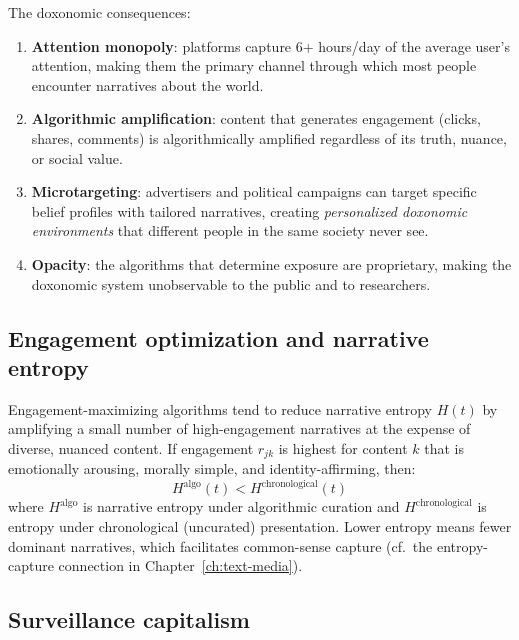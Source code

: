 The doxonomic consequences:
\begin{enumerate}[nosep]
  \item \textbf{Attention monopoly}: platforms capture 6+ hours/day of the average user's attention, making them the primary channel through which most people encounter narratives about the world.
  \item \textbf{Algorithmic amplification}: content that generates engagement (clicks, shares, comments) is algorithmically amplified regardless of its truth, nuance, or social value.
  \item \textbf{Microtargeting}: advertisers and political campaigns can target specific belief profiles with tailored narratives, creating \emph{personalized doxonomic environments} that different people in the same society never see.
  \item \textbf{Opacity}: the algorithms that determine exposure are proprietary, making the doxonomic system unobservable to the public and to researchers.
\end{enumerate}

\subsection{Engagement optimization and narrative entropy}

\begin{proposition}
\label{prop:algo-entropy}
Engagement-maximizing algorithms tend to reduce narrative entropy $H(t)$ by amplifying a small number of high-engagement narratives at the expense of diverse, nuanced content.
If engagement $r_{jk}$ is highest for content $k$ that is emotionally arousing, morally simple, and identity-affirming, then:
\[
  H^{\text{algo}}(t) < H^{\text{chronological}}(t)
\]
where $H^{\text{algo}}$ is narrative entropy under algorithmic curation and $H^{\text{chronological}}$ is entropy under chronological (uncurated) presentation.
Lower entropy means fewer dominant narratives, which facilitates common-sense capture (cf.\ the entropy-capture connection in Chapter~\ref{ch:text-media}).
\end{proposition}

\subsection{Surveillance capitalism}

